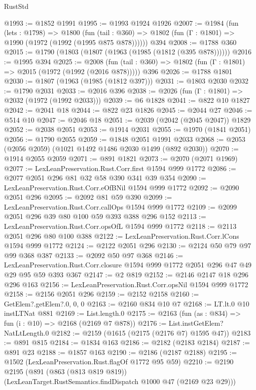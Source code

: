 \begin{lexlean}{RustStd}
\begin{coremodule}
@1993 := @1852 @1991
@1995 := @1993 @1924 @1926
@2007 := @1984
    (fun (lets : @1798) =>
    @1800 (fun (tail : @360) => @1802 (fun (Γ : @1801) => @1990 (@1972 (@1992 (@1995 @875 @878))))))
    @394
@2008 := @1788 @360
@2015 := @1790 (@1803 (@1807 (@1963 (@1985 (@1812 (@395 @878))))))
@2016 := @1995 @394
@2025 := @2008
    (fun (tail : @360) => @1802 (fun (Γ : @1801) => @2015 (@1972 (@1992 (@2016 @878)))))
    @396
@2026 := @1788 @1801
@2030 := @1807 (@1963 (@1985 (@1812 @397)))
@2031 := @1803 @2030
@2032 := @1790 @2031
@2033 := @2016 @396
@2038 := @2026 (fun (Γ : @1801) => @2032 (@1972 (@1992 @2033)))
@2039 := @6 @1828
@2041 := @822 @10 @1827
@2042 := @2041 @18
@2044 := @822 @23 @1826
@2045 := @2044 @27
@2046 := @514 @10
@2047 := @2046 @18
@2051 := @2039 (@2042 (@2045 @2047)) @1829
@2052 := @2038 @2051
@2053 := @1914 @2031
@2055 := @1970 (@1841 @2051)
@2056 := @1790 @2055
@2059 := @1848 @2051 @1991 @2033
@2068 := @2053 (@2056 @2059) (@1021 @1492 @1486 @2030 @1499 (@892 @2030))
@2070 := @1914 @2055 @2059
@2071 := @891 @1821
@2073 := @2070 (@2071 @1969)
@2077 := LexLeanPreservation.Rust.Corr.first @1594 @999 @1772
@2086 := @2077 @2051 @296 @81 @32 @58 @390 @341 @39 @354
@2090 := LexLeanPreservation.Rust.Corr.eOfBNil @1594 @999 @1772
@2092 := @2090 @2051 @296
@2095 := @2092 @81 @59 @390
@2099 := LexLeanPreservation.Rust.Corr.callOps @1594 @999 @1772
@2109 := @2099 @2051 @296 @39 @80 @100 @59 @393 @388 @296 @152
@2113 := LexLeanPreservation.Rust.Corr.opsOfL @1594 @999 @1772
@2118 := @2113 @2051 @296 @80 @100 @388
@2122 := LexLeanPreservation.Rust.Corr.lCons @1594 @999 @1772
@2124 := @2122 @2051 @296
@2130 := @2124 @50 @79 @97 @99 @368 @387
@2133 := @2092 @50 @97 @368
@2146 := LexLeanPreservation.Rust.Corr.closure
    @1594
    @999
    @1772
    @2051
    @296
    @47
    @49
    @29
    @95
    @59
    @393
    @367
@2147 := @2 @819
@2152 := @2146 @2147 @18 @296 @296 @163
@2156 := LexLeanPreservation.Rust.Corr.opsNil @1594 @999 @1772
@2158 := @2156 @2051 @296
@2159 := @2152 @2158
@2160 := GetElem?.getElem?.{0, 0, 0}
@2163 := @2160 @834 @10 @7
@2168 := LT.lt.{0} @10 instLTNat @881
@2169 := List.length.{0}
@2175 := @2163 (fun (as : @834) => fun (i : @10) => @2168 (@2169 @7 @878))
@2176 := List.instGetElem?NatLtLength.{0}
@2182 := @2159 (@1615 (@2175 (@2176 @7) @1595 @47))
@2183 := @891 @815
@2184 := @1834 @163
@2186 := @2182 (@2183 @2184)
@2187 := @891 @23
@2188 := @1857 @163
@2190 := @2186 (@2187 @2188)
@2195 := @1502 (LexLeanPreservation.Rust.flagOf @1772 @95 @59)
@2210 := @2190
    @2195
    (@891
      (@863 (@813 @819 @819))
      (LexLeanTarget.RustSemantics.findDispatch @1000 @47 (@2169 @23 @29)))

\end{coremodule}
\end{lexlean}
